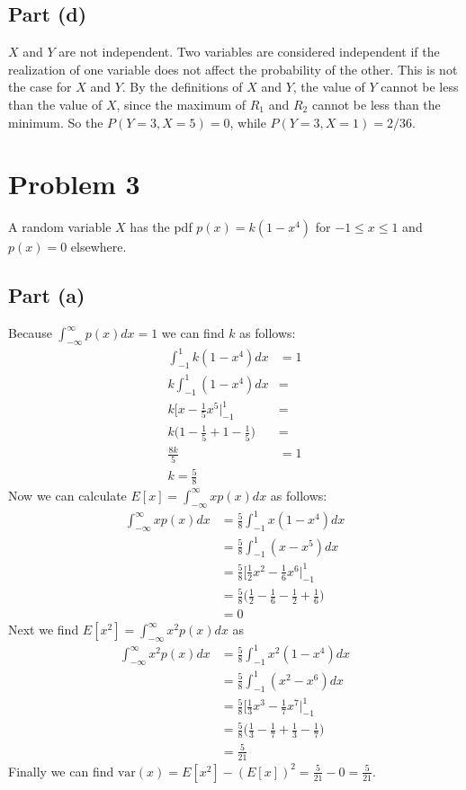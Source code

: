 \documentclass[11pt]{article}
\begin{document}
\subsection*{Part (d)}
$X$ and $Y$ are not independent. Two variables are considered independent if the realization of one variable does not affect the probability of the other. This is not the case for $X$ and $Y$. By the definitions of $X$ and $Y$, the value of $Y$ cannot be less than the value of $X$, since the maximum of $R_1$ and $R_2$ cannot be less than the minimum. So the $P(Y=3,X=5)=0$, while $P(Y=3,X=1) = 2/36$.

\section*{Problem 3}
A random variable $X$ has the pdf $p(x)=k(1-x^4)$ for $-1\leq x\leq1$ and $p(x)=0$ elsewhere.

\subsection*{Part (a)}
Because $\int_{-\infty}^\infty p(x)dx = 1$ we can find $k$ as follows:
\begin{align*}
	\int_{-1}^1 k(1-x^4)dx &= 1 \\
	k\int_{-1}^1(1-x^4)dx &= \\
	k \big[x-\frac{1}{5}x^5 \big|_{-1}^1 &= \\
	k\Big(1-\frac{1}{5}+1-\frac{1}{5}\Big) &= \\
	\frac{8k}{5} &= 1 \\
	k = \frac{5}{8}
\end{align*}
Now we can calculate $E[x] = \int_{-\infty}^\infty xp(x)dx$ as follows:
\begin{align*}
	\int_{-\infty}^\infty xp(x)dx &= \frac{5}{8}\int_{-1}^1x(1-x^4)dx \\
	&= \frac{5}{8}\int_{-1}^1(x-x^5)dx \\
	&= \frac{5}{8} \Bigg[\frac{1}{2}x^2 - \frac{1}{6}x^6 \Bigg|_{-1}^1 \\
	&= \frac{5}{8} \Bigg(\frac{1}{2} - \frac{1}{6} - \frac{1}{2} + \frac{1}{6}\Bigg) \\
	&= 0
\end{align*}
Next we find $E[x^2] = \int_{-\infty}^\infty x^2p(x)dx$ as
\begin{align*}
	\int_{-\infty}^\infty x^2p(x)dx &= \frac{5}{8}\int_{-1}^1x^2(1-x^4)dx \\
	&= \frac{5}{8}\int_{-1}^1(x^2-x^6)dx \\
	&= \frac{5}{8} \Bigg[\frac{1}{3}x^3 - \frac{1}{7}x^7 \Bigg|_{-1}^1 \\
	&= \frac{5}{8} \Bigg(\frac{1}{3} - \frac{1}{7} + \frac{1}{3} - \frac{1}{7}\Bigg) \\
	&= \frac{5}{21}
\end{align*}
Finally we can find $\text{var}(x) = E[x^2]-(E[x])^2 = \frac{5}{21}-0=\frac{5}{21}$.
\end{document}
